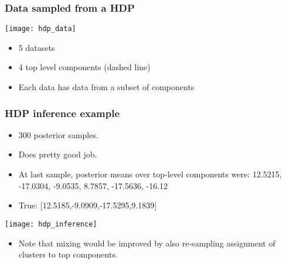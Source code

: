 \begin{frame}
	\frametitle{Data sampled from a \ac{HDP}}
	\begin{multicols}{2}
		\centering\texttt{[image: hdp\_data]}
		\newpage
		\begin{itemize}
			\item 5 datasets
			\item 4 top level components (dashed line)
			\item Each data has data from a subset of components
		\end{itemize}
	\end{multicols}
\end{frame}

\begin{frame}
	\frametitle{\ac{HDP} inference example}
	\begin{multicols}{2}
	\begin{itemize}
		\item 300 posterior samples.
		\item Does pretty good job.
		\item At last sample, posterior means over top-level components were: 12.5215, -17.0304, -9.0535, 8.7857, -17.5636, -16.12
		\item True: [12.5185,-9.0909,-17.5295,9.1839]
	\end{itemize}
	\newpage
	\texttt{[image: hdp\_inference]}		
	\end{multicols}
	\begin{itemize}
		\item Note that mixing would be improved by also re-sampling assignment of clusters to top components.
	\end{itemize}
\end{frame}

